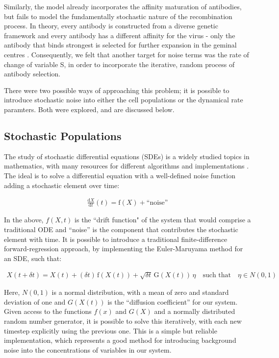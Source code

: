 \documentclass[a4paper, 12pt]{report}
\begin{document}
Similarly, the model already incorporates the affinity maturation of antibodies, but fails to model the fundamentally stochastic nature of the recombination process. In theory, every antibody is constructed from a diverse genetic framework and every antibody has a different affinity for the virus - only the antibody that binds strongest is selected for further expansion in the geminal centres \cite{Grimaldi15022005}. Consequently, we felt that another target for noise terms was the rate of change of variable S, in order to incorporate the iterative, random process of antibody selection.

There were two possible ways of approaching this problem; it is possible to introduce stochastic noise into either the cell populations or the dynamical rate paramters. Both were explored, and are discussed below.

\subsection{Stochastic Populations}

The study of stochastic differential equations (SDEs) is a widely studied topics in mathematics, with many resources for different algorithms and implementations \cite{2001}. The ideal is to solve a differential equation with a well-defined noise function adding a stochastic element over time:

\begin{align}
\frac{\mathrm d X}{\mathrm d t}(t) = \mathrm f (X) + \text{``noise''}
\end{align}

In the above, $f(X,t)$ is the ``drift function" of the system that would comprise a traditional ODE and ``noise'' is the component that contributes the stochastic element with time. It is possible to introduce a traditional finite-difference forward-regression approach, by implementing the Euler-Maruyama method for an SDE, such that:

\begin{align}
\label{eqn:eulerMaruyama}
X(t+\delta t) = X(t) + (\delta t)\, \mathrm f (X(t)) + \sqrt{ \delta t}\, \mathrm G (X(t))\, \eta \quad \text{such that} \quad \eta \in N(0,1)
\end{align}

Here, $N(0,1)$ is a normal distribution, with a mean of zero and standard deviation of one and $G(X(t))$ is the ``diffusion coefficient'' for our system. Given access to the functions $f(x)$ and $G(X)$ and a normally distributed random number generator, it is possible to solve this iteratively, with each new timestep explicitly using the previous one. This is a simple but reliable implementation, which represents a good method for introducing background noise into the concentrations of variables in our system.
\end{document}
